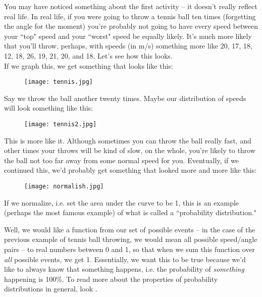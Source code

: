 You may have noticed something about the first activity -- it doesn't really reflect real life. In real life, if you were going to throw a tennis ball ten times (forgetting the angle for the moment) you're probably not going to have every speed between your ``top" speed and your ``worst" speed be equally likely. It's much more likely that you'll throw, perhaps, with speeds (in m/s) something more like 20, 17, 18, 12, 18, 26, 19, 21, 20, and 18. Let's see how this looks. \\

If we graph this, we get something that looks like this:

\begin{figure}[H]
   \centering
   \texttt{[image: tennis.jpg]} 
\end{figure}

Say we throw the ball another twenty times. Maybe our distribution of speeds will look something like this: \\

\begin{figure}[H]
   \centering
   \texttt{[image: tennis2.jpg]} 
\end{figure}

This is more like it. Although sometimes you can throw the ball really fast, and other times your throws will be kind of slow, on the whole, you're likely to throw the ball not too far away from some normal speed for you. Eventually, if we continued this, we'd probably get something that looked more and more like this: \\

\begin{figure}[H]
   \centering
   \texttt{[image: normalish.jpg]} 
\end{figure}

If we normalize, i.e. set the area under the curve to be 1, this is an example (perhaps the most famous example) of what is called a ``probability distribution." \\


Well, we would like a function from our set of possible events -- in the case of the previous example of tennis ball throwing, we would mean all possible speed/angle pairs -- to real numbers between 0 and 1, so that when we sum this function over \emph{all} possible events, we get 1. Essentially, we want this to be true because we'd like to always know that something happens, i.e. the probability of \emph{something} happening is 100\%. To read more about the properties of probability distributions in general, look . \\

